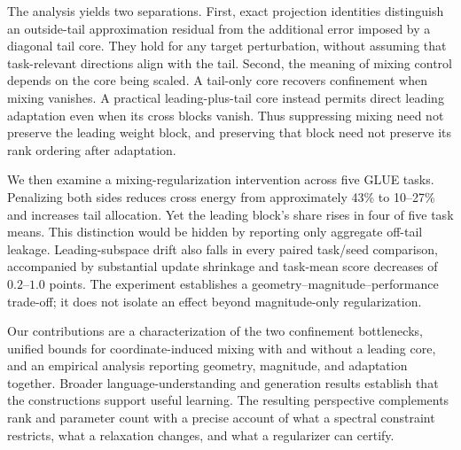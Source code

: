 The analysis yields two separations. First, exact projection identities distinguish an outside-tail approximation residual from the additional error imposed by a diagonal tail core. They hold for any target perturbation, without assuming that task-relevant directions align with the tail. Second, the meaning of mixing control depends on the core being scaled. A tail-only core recovers confinement when mixing vanishes. A practical leading-plus-tail core instead permits direct leading adaptation even when its cross blocks vanish. Thus suppressing mixing need not preserve the leading weight block, and preserving that block need not preserve its rank ordering after adaptation.

We then examine a mixing-regularization intervention across five GLUE tasks. Penalizing both sides reduces cross energy from approximately 43\% to 10--27\% and increases tail allocation. Yet the leading block's share rises in four of five task means. This distinction would be hidden by reporting only aggregate off-tail leakage. Leading-subspace drift also falls in every paired task/seed comparison, accompanied by substantial update shrinkage and task-mean score decreases of $0.2$--$1.0$ points. The experiment establishes a geometry--magnitude--performance trade-off; it does not isolate an effect beyond magnitude-only regularization.

Our contributions are a characterization of the two confinement bottlenecks, unified bounds for coordinate-induced mixing with and without a leading core, and an empirical analysis reporting geometry, magnitude, and adaptation together. Broader language-understanding and generation results establish that the constructions support useful learning. The resulting perspective complements rank and parameter count with a precise account of what a spectral constraint restricts, what a relaxation changes, and what a regularizer can certify.
